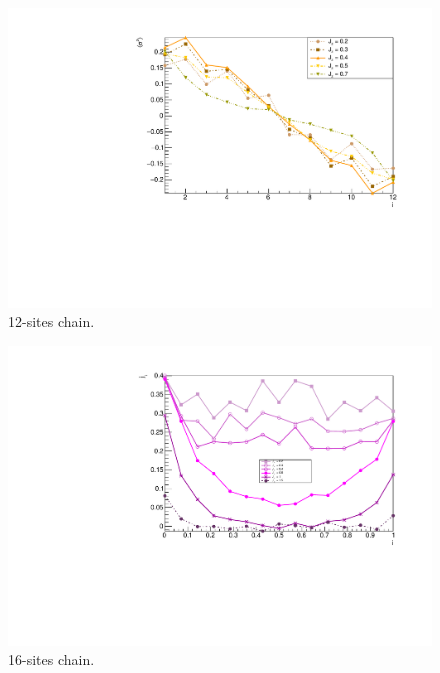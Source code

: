 \begin{figure}[H]
    \centering
    \includegraphics[scale=0.7]{Figures/12sites/12sites_LMvsLOWJz.pdf}
    \caption{12-sites chain.}
    \label{fig:my_label}
\end{figure}

\begin{figure}[H]
    \centering
    \includegraphics[scale=0.7]{Figures/16sites/16sites_SpinCurrVsLOWJz.pdf}
    \caption{16-sites chain.}
    \label{fig:my_label}
\end{figure}

